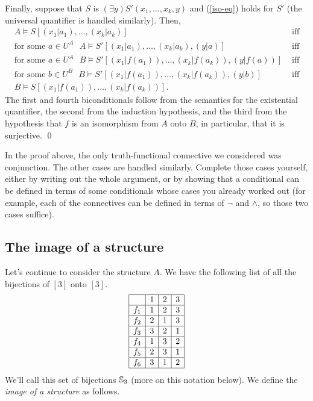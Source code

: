 Finally, suppose that $S$ is $(\exists y)S'(x_1,\ldots,x_k,y)$ and (\ref{iso-eq}) holds for $S'$ (the universal quantifier is handled similarly). Then,
\[
\begin{array}{lc}
A\models S[(x_1|a_1),\ldots,(x_k|a_k)] & \mbox{ iff}\\
\mbox{for some $a\in U^A$ }
A\models S'[(x_1|a_1),\ldots,(x_k|a_k),(y|a)] & \mbox{ iff}\\
\mbox{for some $a\in U^A$ }
B\models S'[(x_1|f(a_1)),\ldots,(x_k|f(a_k)),(y|f(a))] & \mbox{ iff}\\
\mbox{for some $b\in U^B$ }
B\models S'[(x_1|f(a_1)),\ldots,(x_k|f(a_k)),(y|b)] & \mbox{ iff}\\
B\models S[(x_1|f(a_1)),\ldots,(x_k|f(a_k))].
\end{array}
\]
The first and fourth biconditionals follow from the semantics for the existential quantifier, the second from the induction hypothesis, and the third from the hypothesis that $f$ is an isomorphism from $A$ onto $B$, in particular, that it is
surjective. \qed 

\begin{aside}
    In the proof above, the only truth-functional connective we considered was conjunction. The other cases are handled similarly. Complete those cases yourself, either by writing out the whole argument, or by showing that a conditional can be defined in terms of some conditionals whose cases you already worked out (for example, each of the connectives can be defined in terms of $\lnot$ and $\land$, so those two cases suffice). 
\end{aside}


\subsection*{The image of a structure}
Let's continue to consider the structure $A$. We have the following list of all the bijections of $[3]$ onto $[3]$.
\[
\begin{array}{|c|c|c|c|}
\hline
 &1&2&3\\
\hline
f_1&1&2&3\\
\hline
f_2&2&1&3\\
\hline
f_3&3&2&1\\
\hline
f_4&1&3&2\\
\hline
f_5&2&3&1\\
\hline
f_6&3&1&2\\
\hline

\end{array}
\]
We'll call this set of bijections $\mbox{$\mathbb{S}_{3}$}$ (more on this notation below). We define the \emph{image of a structure} as follows.

